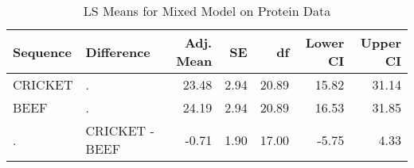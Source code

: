\begin{table}[hbt]

\caption{\label{tab:proteinDataLSMeans}LS Means for Mixed Model on Protein Data}
\centering
\begin{tabular}[t]{l>{}l|rrrrr}
\toprule
Sequence & Difference & Adj. Mean & SE & df & Lower CI & Upper CI\\
\midrule
CRICKET & . & 23.48 & 2.94 & 20.89 & 15.82 & 31.14\\
BEEF & . & 24.19 & 2.94 & 20.89 & 16.53 & 31.85\\
. & CRICKET - BEEF & -0.71 & 1.90 & 17.00 & -5.75 & 4.33\\
\bottomrule
\end{tabular}
\end{table}
